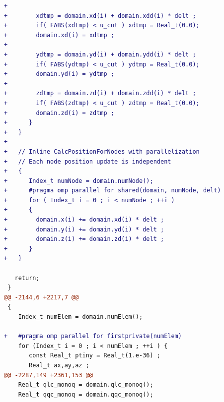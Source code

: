 \begin{lstlisting}[language=diff,basicstyle=\ttfamily\scriptsize,breaklines=true,caption={llnl_c1/lulesh — BROKEN (e6c_r1)}]
+
+        xdtmp = domain.xd(i) + domain.xdd(i) * delt ;
+        if( FABS(xdtmp) < u_cut ) xdtmp = Real_t(0.0);
+        domain.xd(i) = xdtmp ;
+
+        ydtmp = domain.yd(i) + domain.ydd(i) * delt ;
+        if( FABS(ydtmp) < u_cut ) ydtmp = Real_t(0.0);
+        domain.yd(i) = ydtmp ;
+
+        zdtmp = domain.zd(i) + domain.zdd(i) * delt ;
+        if( FABS(zdtmp) < u_cut ) zdtmp = Real_t(0.0);
+        domain.zd(i) = zdtmp ;
+      }
+   }
+
+   // Inline CalcPositionForNodes with parallelization
+   // Each node position update is independent
+   {
+      Index_t numNode = domain.numNode();
+      #pragma omp parallel for shared(domain, numNode, delt)
+      for ( Index_t i = 0 ; i < numNode ; ++i )
+      {
+        domain.x(i) += domain.xd(i) * delt ;
+        domain.y(i) += domain.yd(i) * delt ;
+        domain.z(i) += domain.zd(i) * delt ;
+      }
+   }
 
   return;
 }
@@ -2144,6 +2217,7 @@
 {
    Index_t numElem = domain.numElem();
 
+   #pragma omp parallel for firstprivate(numElem)
    for (Index_t i = 0 ; i < numElem ; ++i ) {
       const Real_t ptiny = Real_t(1.e-36) ;
       Real_t ax,ay,az ;
@@ -2287,149 +2361,153 @@
    Real_t qlc_monoq = domain.qlc_monoq();
    Real_t qqc_monoq = domain.qqc_monoq();
 

\end{lstlisting}
